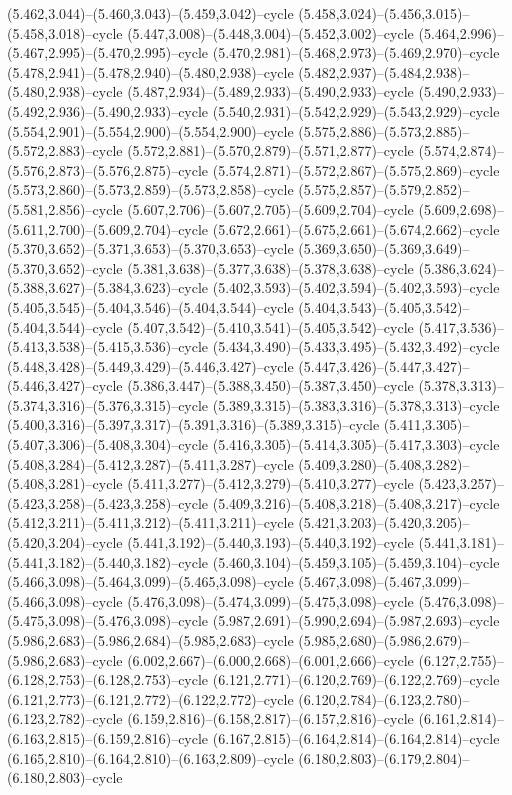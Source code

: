 (5.462,3.044)--(5.460,3.043)--(5.459,3.042)--cycle (5.458,3.024)--(5.456,3.015)--(5.458,3.018)--cycle (5.447,3.008)--(5.448,3.004)--(5.452,3.002)--cycle (5.464,2.996)--(5.467,2.995)--(5.470,2.995)--cycle (5.470,2.981)--(5.468,2.973)--(5.469,2.970)--cycle (5.478,2.941)--(5.478,2.940)--(5.480,2.938)--cycle (5.482,2.937)--(5.484,2.938)--(5.480,2.938)--cycle (5.487,2.934)--(5.489,2.933)--(5.490,2.933)--cycle (5.490,2.933)--(5.492,2.936)--(5.490,2.933)--cycle (5.540,2.931)--(5.542,2.929)--(5.543,2.929)--cycle (5.554,2.901)--(5.554,2.900)--(5.554,2.900)--cycle (5.575,2.886)--(5.573,2.885)--(5.572,2.883)--cycle (5.572,2.881)--(5.570,2.879)--(5.571,2.877)--cycle (5.574,2.874)--(5.576,2.873)--(5.576,2.875)--cycle (5.574,2.871)--(5.572,2.867)--(5.575,2.869)--cycle (5.573,2.860)--(5.573,2.859)--(5.573,2.858)--cycle (5.575,2.857)--(5.579,2.852)--(5.581,2.856)--cycle (5.607,2.706)--(5.607,2.705)--(5.609,2.704)--cycle (5.609,2.698)--(5.611,2.700)--(5.609,2.704)--cycle (5.672,2.661)--(5.675,2.661)--(5.674,2.662)--cycle (5.370,3.652)--(5.371,3.653)--(5.370,3.653)--cycle (5.369,3.650)--(5.369,3.649)--(5.370,3.652)--cycle (5.381,3.638)--(5.377,3.638)--(5.378,3.638)--cycle (5.386,3.624)--(5.388,3.627)--(5.384,3.623)--cycle (5.402,3.593)--(5.402,3.594)--(5.402,3.593)--cycle (5.405,3.545)--(5.404,3.546)--(5.404,3.544)--cycle (5.404,3.543)--(5.405,3.542)--(5.404,3.544)--cycle (5.407,3.542)--(5.410,3.541)--(5.405,3.542)--cycle (5.417,3.536)--(5.413,3.538)--(5.415,3.536)--cycle (5.434,3.490)--(5.433,3.495)--(5.432,3.492)--cycle (5.448,3.428)--(5.449,3.429)--(5.446,3.427)--cycle (5.447,3.426)--(5.447,3.427)--(5.446,3.427)--cycle (5.386,3.447)--(5.388,3.450)--(5.387,3.450)--cycle (5.378,3.313)--(5.374,3.316)--(5.376,3.315)--cycle (5.389,3.315)--(5.383,3.316)--(5.378,3.313)--cycle (5.400,3.316)--(5.397,3.317)--(5.391,3.316)--(5.389,3.315)--cycle (5.411,3.305)--(5.407,3.306)--(5.408,3.304)--cycle (5.416,3.305)--(5.414,3.305)--(5.417,3.303)--cycle (5.408,3.284)--(5.412,3.287)--(5.411,3.287)--cycle (5.409,3.280)--(5.408,3.282)--(5.408,3.281)--cycle (5.411,3.277)--(5.412,3.279)--(5.410,3.277)--cycle (5.423,3.257)--(5.423,3.258)--(5.423,3.258)--cycle (5.409,3.216)--(5.408,3.218)--(5.408,3.217)--cycle (5.412,3.211)--(5.411,3.212)--(5.411,3.211)--cycle (5.421,3.203)--(5.420,3.205)--(5.420,3.204)--cycle (5.441,3.192)--(5.440,3.193)--(5.440,3.192)--cycle (5.441,3.181)--(5.441,3.182)--(5.440,3.182)--cycle (5.460,3.104)--(5.459,3.105)--(5.459,3.104)--cycle (5.466,3.098)--(5.464,3.099)--(5.465,3.098)--cycle (5.467,3.098)--(5.467,3.099)--(5.466,3.098)--cycle (5.476,3.098)--(5.474,3.099)--(5.475,3.098)--cycle (5.476,3.098)--(5.475,3.098)--(5.476,3.098)--cycle (5.987,2.691)--(5.990,2.694)--(5.987,2.693)--cycle (5.986,2.683)--(5.986,2.684)--(5.985,2.683)--cycle (5.985,2.680)--(5.986,2.679)--(5.986,2.683)--cycle (6.002,2.667)--(6.000,2.668)--(6.001,2.666)--cycle (6.127,2.755)--(6.128,2.753)--(6.128,2.753)--cycle (6.121,2.771)--(6.120,2.769)--(6.122,2.769)--cycle (6.121,2.773)--(6.121,2.772)--(6.122,2.772)--cycle (6.120,2.784)--(6.123,2.780)--(6.123,2.782)--cycle (6.159,2.816)--(6.158,2.817)--(6.157,2.816)--cycle (6.161,2.814)--(6.163,2.815)--(6.159,2.816)--cycle (6.167,2.815)--(6.164,2.814)--(6.164,2.814)--cycle (6.165,2.810)--(6.164,2.810)--(6.163,2.809)--cycle (6.180,2.803)--(6.179,2.804)--(6.180,2.803)--cycle 